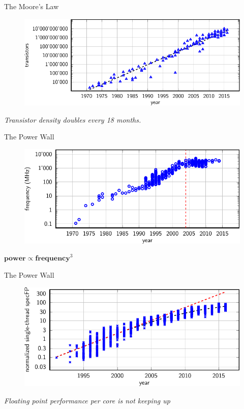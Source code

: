 \documentclass[aspectratio=169,12pt]{beamer}
\begin{document}
\begin{frame}{The Moore's Law}
  \begin{figure}
    \centering
    \includegraphics[width=.8\textwidth]{transistors_growth}
  \end{figure}
  \small
  \vspace{-.5\baselineskip}\centering
  \emph{Transistor density doubles every 18 months.}
\end{frame}

\begin{frame}{The Power Wall}
  \begin{figure}
    \centering
    \includegraphics[width=.8\textwidth]{freq_scaling}
  \end{figure}
  \vspace{-.5\baselineskip}\centering
  $\mathbf{power} \propto \mathbf{frequency}^3$
\end{frame}

\begin{frame}{The Power Wall}
  \begin{figure}
    \centering
    \includegraphics[width=.8\textwidth]{fp_perf}
  \end{figure}
   \vspace{-.5\baselineskip}\centering
   \emph{Floating point performance per core is not keeping up}
\end{frame}
\end{document}
